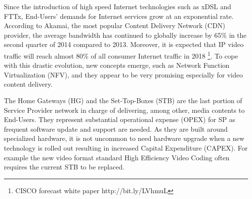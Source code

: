 Since the introduction of high speed Internet technologies such as xDSL and FTTx, End-Users' demands for Internet services grow at an exponential rate.
According to Akamai, the most popular Content Delivery Network (CDN) provider, the average bandwidth has continued to globally increase by 65\% in the second quarter of 2014 \cite{_akamais_2014} compared to 2013. 
Moreover, it is expected that IP video traffic will reach almost 80\% of all consumer Internet traffic in 2018 \footnote{CISCO forecast white paper http://bit.ly/LVhmuL }. To cope with this drastic evolution, new concepts emerge, such as Network Function Virtualization (NFV), and they appear to be very promising especially for video content delivery.


The Home Gateways (HG) and the Set-Top-Boxes (STB) are the last portion of Service Provider network in charge of delivering, among other, media contents to End-Users. 
They represent substantial operational expense (OPEX) for SP as frequent software update and support are needed. 
As they are built around specialized hardware, it is not uncommon to need hardware upgrade when a new technology is rolled out resulting in increased Capital Expenditure (CAPEX). For example the new video format standard  High Efficiency Video Coding often requires the current STB to be replaced.



